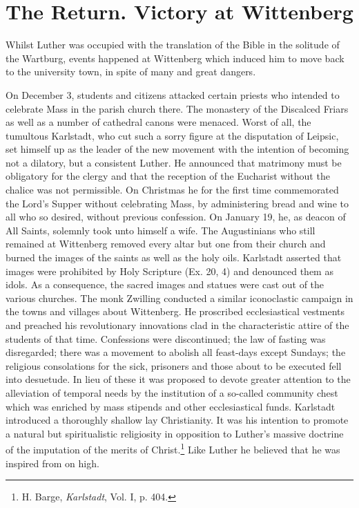 \section{The Return. Victory at Wittenberg}

Whilst Luther was occupied with the translation of the Bible in
the solitude of the Wartburg, events happened at Wittenberg which
induced him to move back to the university town, in spite of many
and great dangers.

On December 3, students and citizens attacked certain priests who
intended to celebrate Mass in the parish church there. The monastery
of the Discalced Friars as well as a number of cathedral canons were
menaced. Worst of all, the tumultous Karlstadt, who cut such a sorry
figure at the disputation of Leipsic, set himself up as the leader of the
new movement with the intention of becoming not a dilatory, but a
consistent Luther. He announced that matrimony must be obligatory
for the clergy and that the reception of the Eucharist without the
chalice was not permissible. On Christmas he for the first time commemorated
the Lord’s Supper without celebrating Mass, by administering
bread and wine to all who so desired, without previous confession. On January
19, he, as deacon of All Saints, solemnly took unto
himself a wife. The Augustinians who still remained at Wittenberg
removed every altar but one from their church and burned the images
of the saints as well as the holy oils. Karlstadt asserted that images
were prohibited by Holy Scripture (Ex. 20, 4) and denounced them
as idols. As a consequence, the sacred images and statues were cast
out of the various churches. The monk Zwilling conducted a similar
iconoclastic campaign in the towns and villages about Wittenberg.
He proscribed ecclesiastical vestments and preached his revolutionary
innovations clad in the characteristic attire of the students of that
time. Confessions were discontinued; the law of fasting was disregarded;
there was a movement to abolish all feast-days except Sundays; the religious
consolations for the sick, prisoners and those about
to be executed fell into desuetude. In lieu of these it was proposed to
devote greater attention to the alleviation of temporal needs by the institution
of a so-called community chest which was enriched by mass
stipends and other ecclesiastical funds. Karlstadt introduced a thoroughly
shallow lay Christianity. It was his intention to promote a natural but
spiritualistic religiosity in opposition to Luther’s massive
doctrine of the imputation of the merits of Christ.\footnote
{H. Barge, \textit{Karlstadt}, Vol. I, p. 404.}
Like Luther he believed that he was inspired from on high.

